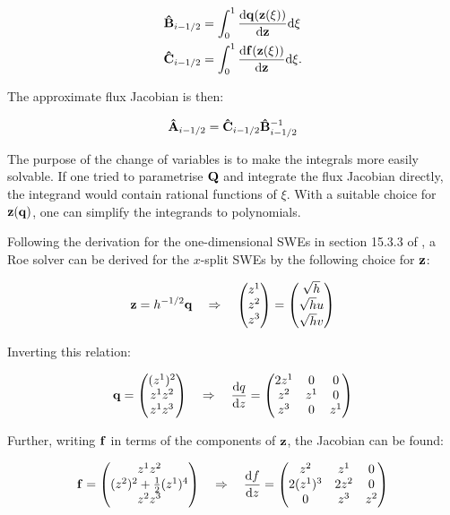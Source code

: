 \begin{subequations}
  \label{eq:roe_integrals}
  \begin{align}
    \vu B_{i-1/2} &= \int_0^1 \dv{\vb q(\vb z(\xi))}{\vb z} \dd \xi \\
    \vu C_{i-1/2} &= \int_0^1 \dv{\vb f(\vb z(\xi))}{\vb z} \dd \xi.
  \end{align}
\end{subequations}

The approximate flux Jacobian is then:

\begin{align}
  \label{eq:roe_product}
  \vu A_{i-1/2} = \vu C_{i-1/2} \vu B_{i-1/2}^{-1}
\end{align}

The purpose of the change of variables is to make the integrals more easily solvable. If one tried to parametrise $\vb Q$ and integrate the flux Jacobian directly, the integrand would contain rational functions of $\xi$. With a suitable choice for $\vb z(\vb q)$, one can simplify the integrands to polynomials.

Following the derivation for the one-dimensional SWEs in section 15.3.3 of \cite{leveque2002finite}, a Roe solver can be derived for the $x$-split SWEs by the following choice for $\vb z$:

\begin{align}
  \vb z = h^{-1/2}\vb q \quad \Rightarrow \quad \mqty(z^1 \\ z^2 \\ z^3) = \mqty(\sqrt{h} \\ \sqrt{h}u \\ \sqrt{h}v)
\end{align}

Inverting this relation:

\begin{align}
  \vb q = \mqty((z^1)^2 \\ z^1z^2 \\ z^1z^3) \quad \Rightarrow \quad \dv{q}{z} = \mqty(
    2z^1 & 0 & 0 \\
    z^2 & z^1 & 0 \\
    z^3 & 0 & z^1
  )
\end{align}

Further, writing $\vb f$ in terms of the components of $\vb z$, the Jacobian can be found:

\begin{align}
  \vb f = \mqty(z^1z^2 \\ (z^2)^2 + \frac{1}{2}(z^1)^4 \\ z^2z^3) \quad \Rightarrow \quad \dv{f}{z} = \mqty(
    z^2 & z^1 & 0 \\
    2 (z^1)^3 & 2 z^2 & 0 \\
    0 & z^3 & z^2
  )
\end{align}

